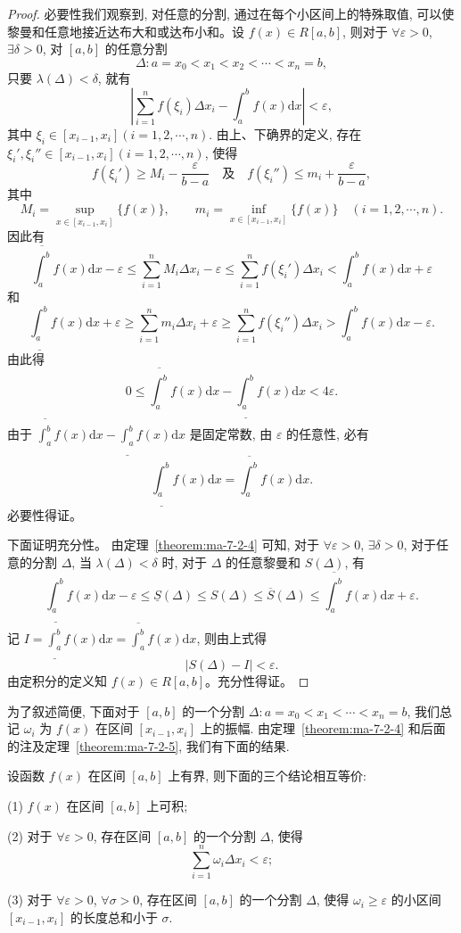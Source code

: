 \begin{proof}
必要性\quad 我们观察到, 对任意的分割, 通过在每个小区间上的特殊取值, 可以使黎曼和任意地接近达布大和或达布小和。设 $f(x)\in R[a,b]$, 则对于 $\forall\varepsilon>0$, $\exists\delta>0$, 对 $[a,b]$ 的任意分割
\[
  \Delta:a=x_0<x_1<x_2<\cdots<x_n=b,
\]
只要 $\lambda(\Delta)<\delta$, 就有
\[
  \left|\sum_{i=1}^n f(\xi_i)\Delta x_i-\int_a^b f(x)\mathrm dx\right|<\varepsilon,
\]
其中 $\xi_i\in[x_{i-1},x_i](i=1,2,\cdots,n)$.
由上、下确界的定义, 存在 $\xi_i',\xi_i''\in[x_{i-1},x_i](i=1,2,\cdots,n)$, 使得
\[
  f(\xi_i')\geq M_i-\frac{\varepsilon}{b-a}\quad\text{及}\quad f(\xi_i'')\leq m_i+\frac{\varepsilon}{b-a},
\]
其中
\[
  M_i=\sup_{x\in[x_{i-1},x_i]}\{f(x)\},\qquad
  m_i=\inf_{x\in[x_{i-1},x_i]}\{f(x)\}\quad(i=1,2,\cdots,n).
\]
因此有
\[
  \overline{\int_a^b} f(x)\mathrm dx-\varepsilon
  \leq \sum_{i=1}^n M_i\Delta x_i-\varepsilon
  \leq \sum_{i=1}^n f(\xi_i')\Delta x_i
  < \int_a^b f(x)\mathrm dx+\varepsilon
\]
和
\[
  \underline{\int_a^b} f(x)\mathrm dx+\varepsilon
  \geq \sum_{i=1}^n m_i\Delta x_i+\varepsilon
  \geq \sum_{i=1}^n f(\xi_i'')\Delta x_i
  > \int_a^b f(x)\mathrm dx-\varepsilon.
\]
由此得
\[
  0\leq \overline{\int_a^b} f(x)\mathrm dx-\underline{\int_a^b} f(x)\mathrm dx<4\varepsilon.
\]
由于 $\overline{\int_a^b} f(x)\mathrm dx-\underline{\int_a^b} f(x)\mathrm dx$ 是固定常数, 由 $\varepsilon$ 的任意性, 必有
\[
  \underline{\int_a^b} f(x)\mathrm dx=\overline{\int_a^b} f(x)\mathrm dx.
\]
必要性得证。

下面证明充分性。
由定理~\ref{theorem:ma-7-2-4} 可知, 对于 $\forall\varepsilon>0$, $\exists\delta>0$, 对于任意的分割 $\Delta$, 当 $\lambda(\Delta)<\delta$ 时, 对于 $\Delta$ 的任意黎曼和 $S(\Delta)$, 有
\[
  \underline{\int_a^b} f(x)\mathrm dx-\varepsilon
  \leq \underline S(\Delta)\leq S(\Delta)\leq \overline S(\Delta)
  \leq \overline{\int_a^b} f(x)\mathrm dx+\varepsilon.
\]
记 $I=\underline{\int_a^b} f(x)\mathrm dx=\overline{\int_a^b} f(x)\mathrm dx$, 则由上式得
\[
  |S(\Delta)-I|<\varepsilon.
\]
由定积分的定义知 $f(x)\in R[a,b]$。充分性得证。
\end{proof}

为了叙述简便, 下面对于 $[a,b]$ 的一个分割 $\Delta:a=x_0<x_1<\cdots<x_n=b$, 我们总记 $\omega_i$ 为 $f(x)$ 在区间 $[x_{i-1},x_i]$ 上的振幅.
由定理~\ref{theorem:ma-7-2-4} 和后面的注及定理~\ref{theorem:ma-7-2-5}, 我们有下面的结果.

\begin{theorem}\label{theorem:ma-7-2-6}
设函数 $f(x)$ 在区间 $[a,b]$ 上有界, 则下面的三个结论相互等价:

(1) $f(x)$ 在区间 $[a,b]$ 上可积;

(2) 对于 $\forall\varepsilon>0$, 存在区间 $[a,b]$ 的一个分割 $\Delta$, 使得
\[
  \sum_{i=1}^n \omega_i\Delta x_i<\varepsilon;
\]

(3) 对于 $\forall\varepsilon>0$, $\forall\sigma>0$, 存在区间 $[a,b]$ 的一个分割 $\Delta$, 使得 $\omega_i\geq\varepsilon$ 的小区间 $[x_{i-1},x_i]$ 的长度总和小于 $\sigma$.
\end{theorem}



